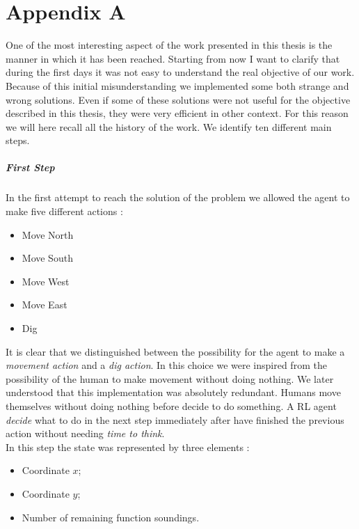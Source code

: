\chapter{Appendix A}

One of the most interesting aspect of the work presented in this thesis is the manner in which it has been reached. Starting from now I want to clarify that during the first days it was not easy to understand the real objective of our work. Because of this initial misunderstanding we implemented some both strange and wrong solutions. Even if some of these solutions were not useful for the objective described in this thesis, they were very efficient in other context. For this reason we will here recall all the history of the work. We identify ten different main steps. 

\paragraph{First Step} In the first attempt to reach the solution of the problem we allowed the agent to make five different actions :

\begin{itemize}
	\item Move North
	\item Move South
	\item Move West
	\item Move East
	\item Dig
\end{itemize}

It is clear that we distinguished between the possibility for the agent to make a \textit{movement action} and a \textit{dig action}. In this choice we were inspired from the possibility of the human to make movement without doing nothing. We later understood that this implementation was absolutely redundant. Humans move themselves without doing nothing before decide to do something. A RL agent \textit{decide} what to do in the next step immediately after have finished the previous action without needing \textit{time to think}. \\

In this step the state was represented by three elements :

\begin{itemize}
	\item Coordinate $x$;
	\item Coordinate $y$;
	\item Number of remaining function soundings.
\end{itemize}

